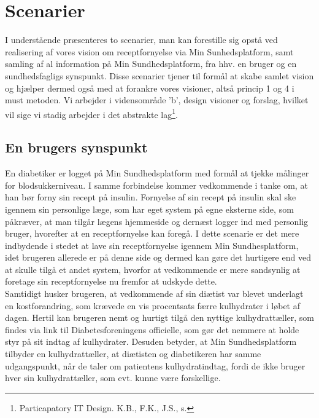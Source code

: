 \section{Scenarier}
I understående præsenteres to scenarier, man kan forestille sig opstå ved realisering af vores vision om receptfornyelse via Min Sunhedsplatform, samt samling af al information 
 på Min Sundhedsplatform, fra hhv. en bruger og en sundhedsfagligs synspunkt. Disse scenarier tjener til formål at skabe samlet vision og hjælper dermed også med at forankre vores visioner, altså princip 1 og 4 i must metoden. Vi arbejder i vidensområde 'b',  design visioner og forslag, hvilket vil sige vi stadig arbejder i det abstrakte lag\footnote{Particapatory IT Design. K.B., F.K., J.S., s.}.  

\subsection{En brugers synspunkt}
En diabetiker er logget på Min Sundhedsplatform med formål at tjekke målinger for blodsukkerniveau. I samme forbindelse kommer vedkommende i tanke om, at han bør forny sin recept på insulin. Fornyelse af sin recept på insulin skal ske igennem sin personlige læge, som har eget system på egne eksterne side, som påkræver, at man tilgår lægens hjemmeside og dernæst logger ind med personlig bruger, hvorefter at en receptfornyelse kan foregå. I dette scenarie er det mere indbydende i stedet at lave sin receptfornyelse igennem Min Sundhesplatform, idet brugeren allerede er på denne side og dermed kan gøre det hurtigere end ved at skulle tilgå et andet system, hvorfor at vedkommende er mere sandsynlig at foretage sin receptfornyelse nu fremfor at udskyde dette.\\
Samtidigt husker brugeren, at vedkommende af sin diætist var blevet underlagt en kostforandring, som krævede en vis procentsats færre kulhydrater i løbet af dagen. Hertil kan brugeren nemt og hurtigt tilgå den nyttige kulhydrattæller, som findes via link til Diabetesforeningens officielle, som gør det nemmere at holde styr på sit indtag af kulhydrater. Desuden betyder, at Min Sundhedsplatform tilbyder en kulhydrattæller, at diætisten og diabetikeren har samme udgangspunkt, når de taler om patientens kulhydratindtag, fordi de ikke bruger hver sin kulhydrattæller, som evt. kunne være forskellige. 


